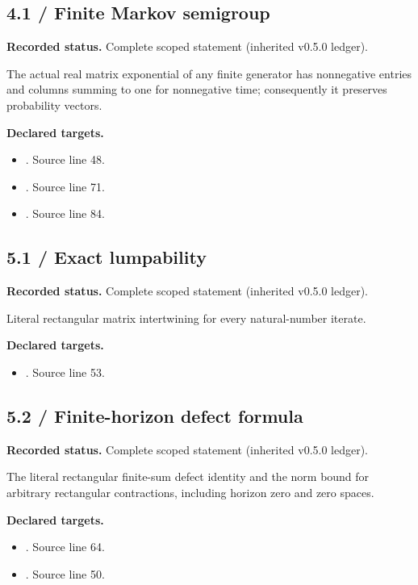 \subsection{4.1 / Finite Markov semigroup}
\label{result:4.1}
\textbf{Recorded status.} Complete scoped statement (inherited v0.5.0 ledger).\par
The actual real matrix exponential of any finite generator has nonnegative entries and columns summing to one for nonnegative time; consequently it preserves probability vectors.

\textbf{Declared targets.}\begin{itemize}
\item {}. Source line 48.
\item {}. Source line 71.
\item {}. Source line 84.
\end{itemize}
\subsection{5.1 / Exact lumpability}
\label{result:5.1}
\textbf{Recorded status.} Complete scoped statement (inherited v0.5.0 ledger).\par
Literal rectangular matrix intertwining for every natural-number iterate.

\textbf{Declared targets.}\begin{itemize}
\item {}. Source line 53.
\end{itemize}
\subsection{5.2 / Finite-horizon defect formula}
\label{result:5.2}
\textbf{Recorded status.} Complete scoped statement (inherited v0.5.0 ledger).\par
The literal rectangular finite-sum defect identity and the norm bound for arbitrary rectangular contractions, including horizon zero and zero spaces.

\textbf{Declared targets.}\begin{itemize}
\item {}. Source line 64.
\item {}. Source line 50.
\end{itemize}
